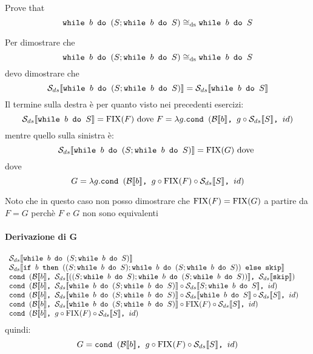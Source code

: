 {Prove that
$$
	 \wbS{b}{(S; \wbS{b}{S})} \eqDS \wbS{b}{S}
$$
}
{
Per dimostrare che 
$$
	 \wbS{b}{(S; \wbS{b}{S})} \eqDS \wbS{b}{S}
$$	
devo dimostrare che
$$
\dsCtxt{\wbS{b}{(S; \wbS{b}{S})}} = \dsCtxt{\wbS{b}{S}} 
$$
Il termine sulla destra è per quanto visto nei precedenti esercizi:
$$
\dsCtxt{\wbS{b}{S}} = \fixp{F} \text{ dove } F = \lambda g. \cond{b}{g \circ \dsCtxt{S}}{id}
$$
mentre quello sulla sinistra è:
$$
\dsCtxt{\wbS{b}{(S; \wbS{b}{S}})} = \fixp{G} \text{ dove } 
$$
dove 
$$
G = \lambda g. \cond{b}{g \circ \fixp{F} \circ \dsCtxt{S}}{id} 
$$

Noto che in questo caso non posso dimostrare che $\fixp{F} = \fixp{G}$ a partire da $F = G$ perchè
$F$ e $G$ non sono equivalenti

\paragraph{Derivazione di G}
$$
\begin{array}{ll}
\dsCtxt{\wbS{b}{(S; \wbS{b}{S})}} & \\
\dsCtxt{\ifABC{b}{((S; \wbS{b}{S}); \wbS{b}{(S; \wbS{b}{S})})}{\skipForFriends}} & \\
\cond{b}{\dsCtxt{((S; \wbS{b}{S}); \wbS{b}{(S; \wbS{b}{S})})}}{\dsCtxt{\skipForFriends}}\\
\cond{b}{\dsCtxt{\wbS{b}{(S; \wbS{b}{S})}} \circ \dsCtxt{S; \wbS{b}{S}}}{id} & \\
\cond{b}{\dsCtxt{\wbS{b}{(S; \wbS{b}{S})}} \circ \dsCtxt{\wbS{b}{S}} \circ \dsCtxt{S}}{id} & \\
\cond{b}{\dsCtxt{\wbS{b}{(S; \wbS{b}{S})}} \circ \fixp{F} \circ \dsCtxt{S}}{id} & \\
\cond{b}{g \circ \fixp{F} \circ \dsCtxt{S}}{id} & \\
\end{array}
$$
quindi:
$$
G = \cond{b}{g \circ \fixp{F} \circ \dsCtxt{S}}{id}
$$
}